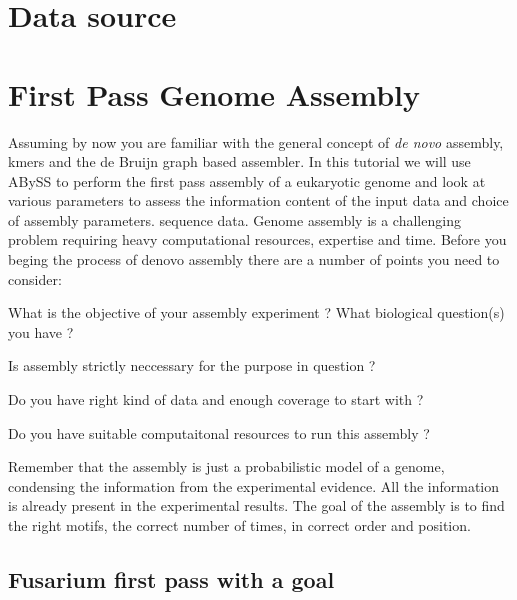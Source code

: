 \section{Data source}

\newpage

\section{First Pass Genome Assembly}
\begin{information}
Assuming by now you are familiar with the general concept of \textit{de novo} assembly, kmers and the de Bruijn graph based assembler. In this tutorial we will use ABySS to perform  the first pass assembly of a eukaryotic genome and look at various parameters to assess the information content of the input data and choice of assembly parameters. 
sequence data. 
Genome assembly is a challenging problem requiring heavy computational resources, expertise and time. Before you beging the process of denovo assembly there are a number of points you need to consider:
\item What is the objective of your assembly experiment ? What biological question(s) you have ?
\item Is assembly strictly neccessary for the purpose in question ?
\item Do you have right kind of data and enough coverage to start with ?
\item Do you have suitable computaitonal resources to run this assembly ?

\end{information}

\begin{note}
Remember that the assembly is just a probabilistic model of a genome, condensing the information 
from the experimental evidence.  All the information is already present in the 
experimental results. The goal of the assembly is to find the right motifs, 
the correct number of times, in correct order and position.
\end{note}


\subsection{Fusarium first pass with a goal}

